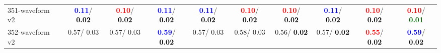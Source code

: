 \begin{table}[h]
\begin{center}
{\begin{tabular}{lc|c|c|c|c|c|c|c|c}
351-waveform v2 & \textcolor{blue}{\textbf{  0.11}}/\textcolor{black}{\textbf{  0.02}} & \textcolor{red}{\textbf{  0.10}}/\textcolor{black}{\textbf{  0.02}} & \textcolor{blue}{\textbf{  0.11}}/\textcolor{black}{\textbf{  0.02}} & \textcolor{blue}{\textbf{  0.11}}/\textcolor{black}{\textbf{  0.02}} & \textcolor{red}{\textbf{  0.10}}/\textcolor{black}{\textbf{  0.02}} & \textcolor{red}{\textbf{  0.10}}/\textcolor{black}{\textbf{  0.02}} & \textcolor{blue}{\textbf{  0.11}}/\textcolor{black}{\textbf{  0.02}} & \textcolor{red}{\textbf{  0.10}}/\textcolor{black}{\textbf{  0.02}} & \textcolor{red}{\textbf{  0.10}}/\textcolor{darkgreen}{\textbf{  0.01}} \\
352-waveform v2 &   0.57/  0.03 &   0.57/  0.03 & \textcolor{blue}{\textbf{  0.59}}/\textcolor{black}{\textbf{  0.02}} &   0.57/  0.03 &   0.58/  0.03 &   0.56/\textcolor{black}{\textbf{  0.02}} &   0.57/\textcolor{black}{\textbf{  0.02}} & \textcolor{red}{\textbf{  0.55}}/\textcolor{black}{\textbf{  0.02}} & \textcolor{blue}{\textbf{  0.59}}/\textcolor{black}{\textbf{  0.02}} \\\end{tabular}}\label{stratsALCKappa10AllReduxhalfa}
\end{center}
\end{table}
